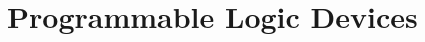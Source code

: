 \documentclass[a4paper, 11pt, oneside]{article}
\date{\today}
\begin{document}
 

\setcounter{ANIMATION}{1}




\thispagestyle{empty}
\setcounter{page}{0}
\tableofcontents
\clearpage




\part{Programmable Logic Devices} 
\clearpage











\clearpage
\printbibliography
\end{document}
